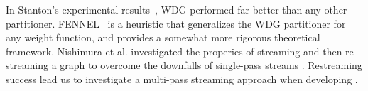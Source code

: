 In Stanton's experimental results~\cite{Stanton:2012:SGP:2339530.2339722}, WDG performed far better than any other partitioner.
FENNEL~\cite{tsourakakis2012fennel} is a heuristic that generalizes the WDG partitioner for any weight function, and provides a somewhat more rigorous theoretical framework.
Nishimura et al. investigated the properies of streaming and then re-streaming a graph to overcome the downfalls of single-pass streams \cite{nishimura2013restream}.
Restreaming success lead us to investigate a multi-pass streaming approach when developing \ourmethod.
